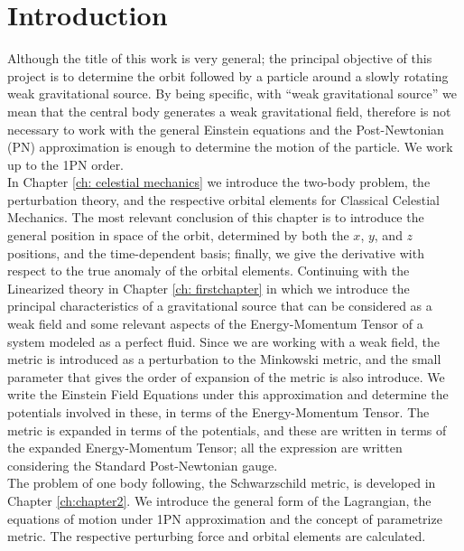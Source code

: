 \chapter*{Introduction}
Although the title of this work is very general; the principal objective of this project is to determine the orbit followed by a particle around a slowly rotating weak gravitational source. By being specific, with ``weak gravitational source'' we mean that the central body generates a weak gravitational field, therefore is not necessary to work with the general Einstein equations and the Post-Newtonian (PN) approximation is enough to determine the motion of the particle. We work up to the 1PN order. \cite{ GravityPoisson, Weinberg, Theoryandexperiments}\\

In Chapter \ref{ch: celestial mechanics} we introduce the two-body problem, the perturbation theory, and the respective orbital elements for Classical Celestial Mechanics. The most relevant conclusion of this chapter is to introduce the general position in space of the orbit, determined by both the $x$, $y$, and $z$ positions, and the time-dependent basis; finally, we give the derivative with respect to the true anomaly of the orbital elements. Continuing with the Linearized theory in Chapter \ref{ch: firstchapter} in which we introduce the principal characteristics of a gravitational source that can be considered as a weak field and some relevant aspects of the Energy-Momentum Tensor of a system modeled as a perfect fluid. Since we are working with a weak field, the metric is introduced as a perturbation to the Minkowski metric, and the small parameter that gives the order of expansion of the metric is also introduce. We write the Einstein Field Equations under this approximation and determine the potentials involved in these, in terms of the Energy-Momentum Tensor. The metric is expanded in terms of the potentials, and these are written in terms of the expanded Energy-Momentum Tensor; all the expression are written considering the Standard Post-Newtonian gauge.\cite{GravityPoisson} \\

The problem of one body following, the Schwarzschild metric, is developed in Chapter \ref{ch:chapter2}. We introduce the general form of the Lagrangian, the equations of motion under 1PN approximation and the concept of parametrize metric. The respective perturbing force and orbital elements are calculated.\\

